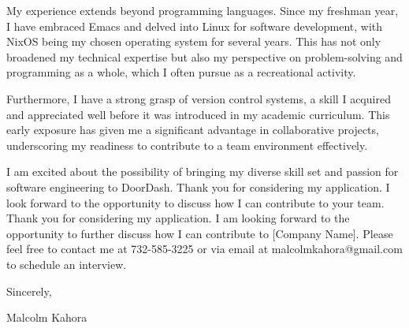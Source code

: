 \documentclass[letterpaper,11pt]{article}
\begin{document}
My experience extends beyond programming languages. Since my freshman year, I have embraced Emacs and delved into Linux for software development, with NixOS being my chosen operating system for several years. This has not only broadened my technical expertise but also my perspective on problem-solving and programming as a whole, which I often pursue as a recreational activity.

Furthermore, I have a strong grasp of version control systems, a skill I acquired and appreciated well before it was introduced in my academic curriculum. This early exposure has given me a significant advantage in collaborative projects, underscoring my readiness to contribute to a team environment effectively.

I am excited about the possibility of bringing my diverse skill set and passion for software engineering to DoorDash. Thank you for considering my application. I look forward to the opportunity to discuss how I can contribute to your team.\vspace{12pt}
Thank you for considering my application. I am looking forward to the opportunity to further discuss how I can contribute to [Company Name]. Please feel free to contact me at 732-585-3225 or via email at malcolmkahora@gmail.com to schedule an interview.

\vspace{12pt}
Sincerely,

\vspace{50pt}
Malcolm Kahora
\end{document}
